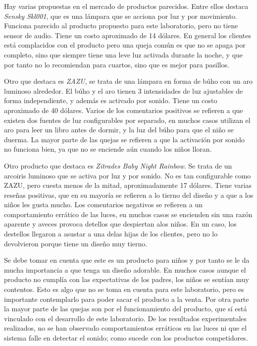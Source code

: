 Hay varias propuestas en el mercado de productos parecidos. Entre ellos destaca \textit{Sensky
  Skl001}, que es una lámpara que se acciona por luz y por movimiento. Funciona parecido al producto
propuesto para este laboratorio, pero no tiene sensor de audio. Tiene un costo aproximado de 14
dólares. En general los clientes está complacidos con el producto pero una queja común es que no se
apaga por completo, sino que siempre tiene una leve luz activada durante la noche, y que por tanto
no lo recomiendan para cuartos, sino que es mejor para pasillos.

Otro que destaca es \textit{ZAZU}, se trata de una lámpara en forma de búho con un aro luminoso alrededor. El
búho y el aro tienen 3 intensidades de luz ajustables de forma independiente, y además es activado
por sonido. Tiene un costo aproximado de 40 dólares. Varios de los comentarios positivos se refieren
a que existen dos fuentes de luz configurables por separado, en muchos casos utilizan el aro para
leer un libro antes de dormir, y la luz del búho para que el niño se duerma. La mayor parte de las
quejas se refieren a que la activación por sonido no funciona bien, ya que no se enciende aún cuando
los niños lloran.

Otro producto que destaca es \textit{Zitrades Baby Night Rainbow}. Se trata de un arcoiris luminoso que se
activa por luz y por sonido. No es tan configurable como ZAZU, pero cuesta menos de la mitad,
aproximadamente 17 dólares. Tiene varias reseñas positivas, que en su mayoría se refieren a lo
tierno del diseño y a que a los niños les gusta mucho. Los comentarios negativos se refieren a un
comportamiento errático de las luces, en muchos casos se encienden sin una razón aparente y aveces
provoca detellos que despiertan alos niños. En un caso, los destellos llegaron a asustar a una delas
hijas de los clientes, pero no lo devolvieron porque tiene un diseño muy tierno.

Se debe tomar en cuenta que este es un producto para niños y por tanto se le da mucha importancia a
que tenga un diseño adorable. En muchos casos aunque el producto no cumplía con las expectativas de
los padres, los niños se sentían muy contentos. Esto es algo que no se toma en cuenta para este
laboratorio, pero es importante contemplarlo para poder sacar el producto a la venta. Por otra parte
la mayor parte de las quejas son por el funcionamiento del producto, que sí está vinculado con el
desarrollo de este laboratorio. De los resultados experimentales realizados, no se han observado
comportamientos erráticos en las luces ni que el sistema falle en detectar el sonido; como sucede con
los productos competidores.

